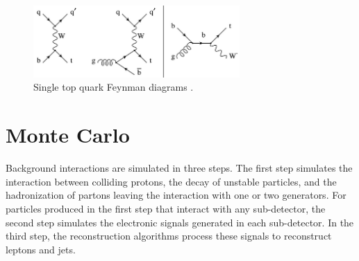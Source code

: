 \begin{figure}[h]
	\centering
	\includegraphics[width=0.7\textwidth]{figures/singleTopQuarkFeynDiagrams.png}
	\caption{Single top quark Feynman diagrams \cite{singleTopQrkDiagrams}.}
	\label{fig:singleTopDiags}
\end{figure}

\clearpage

\section{Monte Carlo}
\label{sec:MC}
Background interactions are simulated in three steps.  The first 
step simulates the interaction between colliding protons, the decay of unstable particles, and the hadronization of 
partons leaving the interaction with one or two \MC generators.  For particles produced in the first step that interact with 
any sub-detector, the second step simulates the electronic signals generated in each sub-detector.  In the third step, the 
reconstruction algorithms process these signals to reconstruct leptons and jets.

